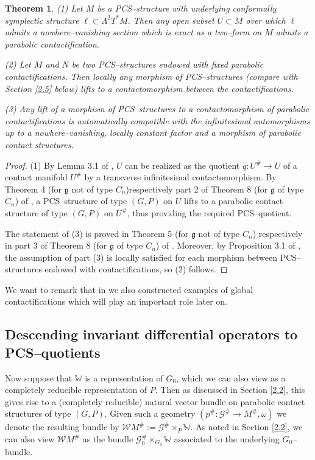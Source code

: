 \documentclass[12pt,a4paper]{amsart}
\def\frak{\mathfrak}
\def\Bbb{\mathbb}
\def\Cal{\mathcal}
\newcommand{\x}{\times}
\newcommand{\om}{\omega}
\newcommand{\La}{\Lambda}
\newcounter{theorem}
\numberwithin{theorem}{section}
\newtheorem{thm}[theorem]{Theorem}
\theoremstyle{definition}
\theoremstyle{remark}
\begin{document}
\begin{thm}\label{thm2.3}
(1) Let $M$ be a PCS--structure with underlying conformally symplectic
  structure $\ell\subset\La^2T^*M$. Then any open subset $U\subset M$
  over which $\ell$ admits a nowhere--vanishing section which is exact
  as a two--form on $M$ admits a parabolic contactification.

  (2) Let $M$ and $N$ be two PCS--structures endowed with fixed
  parabolic contactifications. Then locally any morphism of
  PCS--structures (compare with Section \ref{2.5} below) lifts to a
  contactomorphism between the contactifications. 

(3) Any lift of a morphism of PCS--structures to a contactomorphism of
  parabolic contactifications is automatically compatible with the
  infinitesimal automorphisms up to a nowhere--vanishing, locally
  constant factor and a morphism of parabolic contact structures.
\end{thm}
\begin{proof}
  (1) By Lemma 3.1 of \cite{Cap-Salac}, $U$ can be realized as the
  quotient $q:U^\#\to U$ of a contact manifold $U^\#$ by a transverse
  infinitesimal contactomorphism. By Theorem 4 (for $\frak g$ not of
  type $C_n$)respectively part 2 of Theorem 8 (for $\frak g$ of type
  $C_n$) of \cite{PCS2}, a PCS--structure of type $(G,P)$ on $U$ lifts
  to a parabolic contact structure of type $(G,P)$ on $U^\#$, thus
  providing the required PCS--quotient.

\smallskip

The statement of (3) is proved in Theorem 5 (for $\frak g$ not of type
$C_n$) respectively in part 3 of Theorem 8 (for $\frak g$ of type
$C_n$) of \cite{PCS2}. Moreover, by Proposition 3.1 of
\cite{Cap-Salac}, the assumption of part (3) is locally satisfied for
each morphism between PCS--structures endowed with contactifications,
so (2) follows.
\end{proof}

We want to remark that in \cite{PCS2} we also constructed examples of
global contactifications which will play an important role later on. 

\subsection{Descending invariant differential operators to
  PCS--quotients}\label{2.4} 
Now suppose that $\Bbb W$ is a representation of $G_0$, which we can
also view as a completely reducible representation of $P$. Then as
discussed in Section \ref{2.2}, this gives rise to a (completely
reducible) natural vector bundle on parabolic contact structures of
type $(G,P)$. Given such a geometry $(p^\#:\Cal G^\#\to M^\#,\om)$ we
denote the resulting bundle by $\Cal WM^\#:=\Cal G^\#\x_P\Bbb W$. As
noted in Section \ref{2.2}, we can also view $\Cal WM^\#$ as the
bundle $\Cal G_0^\#\x_{G_0}\Bbb W$ associated to the underlying
$G_0$--bundle.
\end{document}
